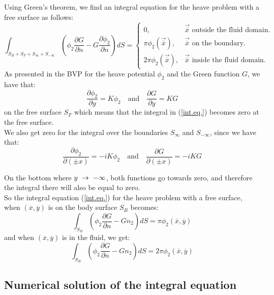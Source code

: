 \documentclass[a4paper,10pt]{article}
\newcommand{\dd}{\partial}
\newcommand{\xbar}{\overline{x}}
\newcommand{\ybar}{\overline{y}}
\begin{document}
Using Green's theorem, we find an integral equation for the heave problem with a free surface as follows:
\begin{equation} \label{int.eq.}
	\int_{S_B + S_F + S_\infty + S_{-\infty}}(\phi_2 \frac{\dd G}{\dd n} - G \frac{\dd \phi_2}{\dd n})dS = \begin{cases}
		0, & \text{$\vec{\xbar}$ outside the fluid domain}.\\
		\pi \phi_2(\vec{\xbar}), & \text{$\vec{\xbar}$ on the boundary}.\\
    	2\pi \phi_2(\vec{\xbar}), & \text{$\vec{\xbar}$ inside the fluid domain}.
	\end{cases} 
\end{equation}
As presented in the BVP for the heave potential $\phi_2$ and the Green function $G$, we have that:
$$\frac{\dd \phi_2}{\dd y} = K \phi_2 \quad \text{and} \quad \frac{\dd G}{\dd y} = KG$$ on the free surface $S_F$
which means that the integral in (\ref{int.eq.}) becomes zero at the free surface.\\[1 em]

We also get zero for the integral over the boundaries $S_\infty$ and $S_{- \infty}$, since we have that: 
$$\frac{\dd \phi_2}{\dd (\pm x)} = -i K \phi_2 \quad \text{and} \quad \frac{\dd G}{\dd (\pm x)} = -i K G$$

On the bottom where $y \hspace{1mm} \rightarrow \hspace{1mm} -\infty$, both functions go towards zero, and therefore the integral there will also be equal to zero.\\[1 em]

So the integral equation (\ref{int.eq.}) for the heave problem with a free surface, when $(\xbar, \ybar)$ is on the body surface $S_B$ becomes:
\begin{equation} \label{int.eq.on_SB}
	\int_{S_B}(\phi_2 \frac{\dd G}{\dd n} - G n_2)dS = \pi \phi_2(\xbar, \ybar)
\end{equation}
and when $(\xbar, \ybar)$ is in the fluid, we get:
\begin{equation}\label{int.eq.in_V}
	\int_{S_B}(\phi_2 \frac{\dd G}{\dd n} - G n_2)dS = 2 \pi \phi_2(\xbar, \ybar)
\end{equation}

\subsection{Numerical solution of the integral equation}
\end{document}
